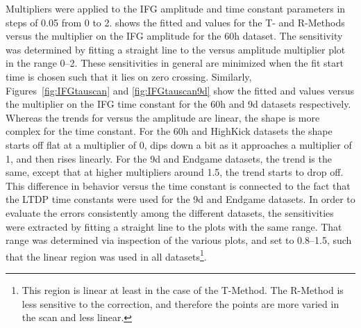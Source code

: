 Multipliers were applied to the IFG amplitude and time constant parameters in steps of 0.05 from 0 to 2.  shows the fitted \R and \chisq values for the T- and R-Methods versus the multiplier on the IFG amplitude for the 60h dataset. The sensitivity was determined by fitting a straight line to the \R versus amplitude multiplier plot in the range 0--2. These sensitivities in general are minimized when the fit start time is chosen such that it lies on \gmtwo zero crossing. Similarly, Figures~\ref{fig:IFGtauscan} and \ref{fig:IFGtauscan9d} show the fitted \R and \chisq values versus the multiplier on the IFG time constant for the 60h and 9d datasets respectively. Whereas the trends for \R versus the amplitude are linear, the shape is more complex for the time constant. For the 60h and HighKick datasets the shape starts off flat at a multiplier of 0, dips down a bit as it approaches a multiplier of 1, and then rises linearly. For the 9d and Endgame datasets, the trend is the same, except that at higher multipliers around 1.5, the trend starts to drop off. This difference in behavior versus the time constant is connected to the fact that the LTDP time constants were used for the 9d and Endgame datasets. In order to evaluate the errors consistently among the different datasets, the sensitivities were extracted by fitting a straight line to the plots with the same range. That range was determined via inspection of the various plots, and set to 0.8--1.5, such that the linear region was used in all datasets\footnote{This region is linear at least in the case of the T-Method. The R-Method is less sensitive to the correction, and therefore the points are more varied in the scan and less linear.}. 



